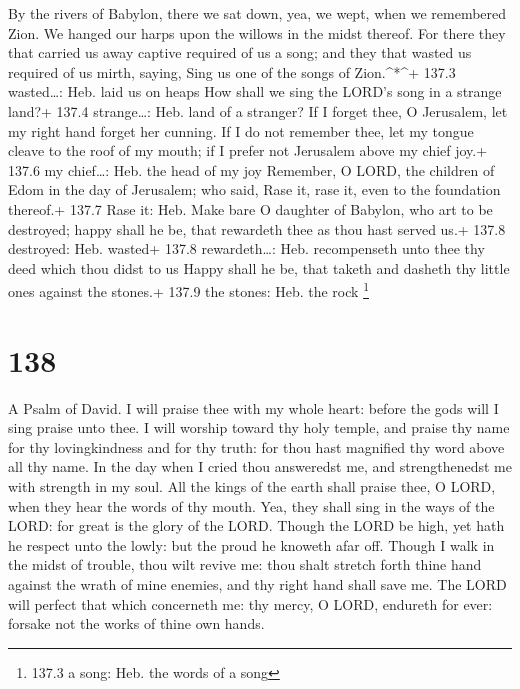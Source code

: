  By the rivers of Babylon, there we sat down, yea, we wept,
when we remembered Zion.  We hanged our harps upon the
willows in the midst thereof.  For there they that carried
us away captive required of us a song; and they that wasted us required
of us mirth, saying, Sing us one of the songs of Zion.\^{}*\^{}+ 137.3
wasted\ldots: Heb. laid us on heaps  How shall we sing the
LORD's song in a strange land?+ 137.4 strange\ldots: Heb. land of a
stranger?  If I forget thee, O Jerusalem, let my right hand
forget her cunning.  If I do not remember thee, let my
tongue cleave to the roof of my mouth; if I prefer not Jerusalem above
my chief joy.+ 137.6 my chief\ldots: Heb. the head of my joy
 Remember, O LORD, the children of Edom in the day of
Jerusalem; who said, Rase it, rase it, even to the foundation thereof.+
137.7 Rase it: Heb. Make bare  O daughter of Babylon, who
art to be destroyed; happy shall he be, that rewardeth thee as thou hast
served us.+ 137.8 destroyed: Heb. wasted+ 137.8 rewardeth\ldots: Heb.
recompenseth unto thee thy deed which thou didst to us 
Happy shall he be, that taketh and dasheth thy little ones against the
stones.+ 137.9 the stones: Heb. the rock \footnote{137.3 a song: Heb.
  the words of a song}

\hypertarget{section-138}{%
\section{138}\label{section-138}}

A Psalm of David.  I will praise thee with my whole heart:
before the gods will I sing praise unto thee.  I will
worship toward thy holy temple, and praise thy name for thy
lovingkindness and for thy truth: for thou hast magnified thy word above
all thy name.  In the day when I cried thou answeredst me,
and strengthenedst me with strength in my soul.  All the
kings of the earth shall praise thee, O LORD, when they hear the words
of thy mouth.  Yea, they shall sing in the ways of the LORD:
for great is the glory of the LORD.  Though the LORD be
high, yet hath he respect unto the lowly: but the proud he knoweth afar
off.  Though I walk in the midst of trouble, thou wilt
revive me: thou shalt stretch forth thine hand against the wrath of mine
enemies, and thy right hand shall save me.  The LORD will
perfect that which concerneth me: thy mercy, O LORD, endureth for ever:
forsake not the works of thine own hands.

